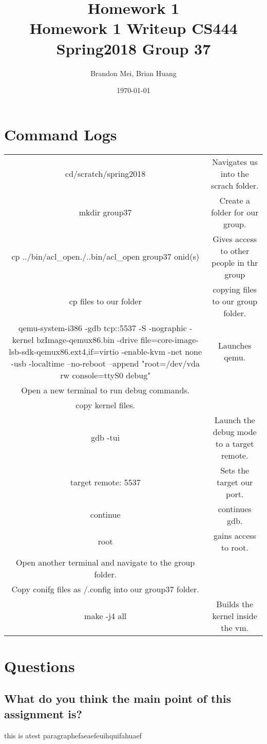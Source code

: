 \documentclass[onecolumn, 10pt, titlepage]{IEEEtran}
\title
{%
	Homework 1 \\
	\vspace{0.4cm}
	\large Homework 1 Writeup
	\vspace{0.4cm}
	\large CS444 Spring2018 Group 37
}
\author{Brandon Mei, Brian Huang}
\date{\today}
\begin{document}
\maketitle

\section*{Command Logs}
\begin{center}
	\begin{tabular}{ c c }
		cd/scratch/spring2018 & Navigates us into the scrach folder. \\
		mkdir group37 & Create a folder for our group. \\
		cp ../bin/acl\_open./..bin/acl\_open group37 onid(s) & Gives access to other people in thr group \\
		cp files to our folder & copying files to our group folder.\\
		qemu-system-i386 -gdb tcp::5537 -S -nographic -kernel bzImage-qemux86.bin -drive file=core-image-lsb-sdk-qemux86.ext4,if=virtio -enable-kvm -net none -usb -localtime --no-reboot --append "root=/dev/vda rw console=ttyS0 debug" & Launches qemu.\\
		Open a new terminal to run debug commands. & \\
		copy kernel files. & \\
		gdb -tui & Launch the debug mode to a target remote. \\
		target remote: 5537 & Sets the target our port. \\
		continue & continues gdb. \\
		root & gains access to root. \\
		Open another terminal and navigate to the group folder. & \\
		Copy conifg files as /.config into our group37 folder. & \\
		make -j4 all & Builds the kernel inside the vm. \\
		
	\end{tabular} 
\end{center}

\section*{Questions}
\subsection*{What do you think the main point of this assignment is?}
this is atest paragraphefaeaefeuihquifahuaef
\end{document}

